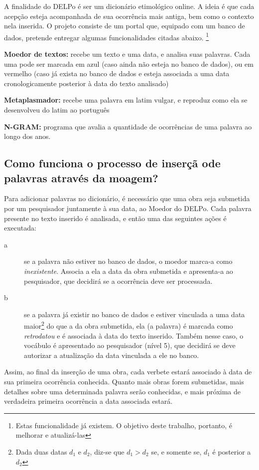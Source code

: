 A finalidade do DELPo é ser um dicionário etimológico online. A ideia é que cada acepção
esteja acompanhada de sua ocorrência mais antiga, bem como o contexto nela inserida. O
projeto consiste de um portal que, equipado com um banco de dados, pretende entregar algumas
funcionalidades citadas abaixo. \footnote{Estas funcionalidade já existem. O objetivo deste
trabalho, portanto, é melhorar e atualizá-las}

\textbf{Moedor de textos:} recebe um texto e uma data, e analisa suas palavras. Cada uma pode
ser marcada em azul (caso ainda não esteja no banco de dados), ou em vermelho (caso já exista
no banco de dados e esteja associada a uma data cronologicamente posterior à data do texto
analisado)

\textbf{Metaplasmador:} recebe uma palavra em latim vulgar, e reproduz como ela se desenvolveu
do latim ao português

\textbf{N-GRAM:} programa que avalia a quantidade de ocorrências de uma palavra ao longo dos
anos.

\subsection{Como funciona o processo de inserçã ode palavras através da moagem?}
\label{subsec:moagem}

Para adicionar palavras no dicionário, é necessário que uma obra seja submetida
por um pesquisador juntamente à sua data, ao Moedor do DELPo. Cada palavra presente
no texto inserido é analisada, e então uma das seguintes ações é executada:
\begin{description}
    \item[a]  se a palavra não estiver no banco de dados, o moedor marca-a como
    \emph{inexistente}. Associa a ela a data da obra submetida e apresenta-a ao
    pesquisador, que decidirá se a ocorrência deve ser processada.
    \item[b] se a palavra já existir no banco de dados e estiver vinculada a uma
    data maior\footnote{Dada duas datas $d_1$ e $d_2$, diz-se que $d_1 > d_2$ se,
    e somente se, $d_1$ é posterior a $d_2$} do que a da obra submetida, ela (a
    palavra) é marcada como \emph{retrodatou} e é associada à data do texto
    inserido. Também nesse caso, o vocábulo é apresentado ao pesquisador (nível
    5), que decidirá se deve autorizar a atualização da data vinculada a ele no banco.
\end{description}

Assim, ao final da inserção de uma obra, cada verbete estará associado à data de
sua primeira ocorrência conhecida. Quanto mais obras forem submetidas, mais detalhes
sobre uma determinada palavra serão conhecidas, e mais próxima de verdadeira
primeira ocorrência a data associada estará.

